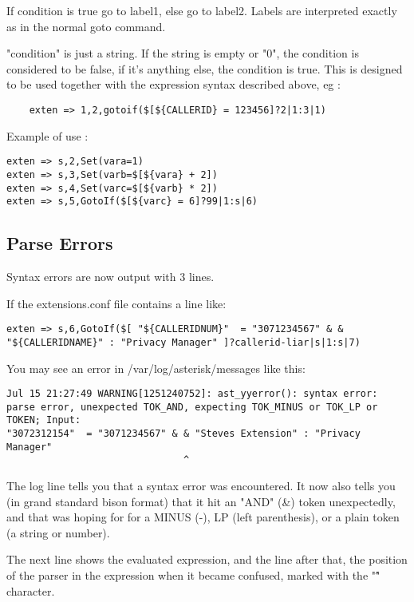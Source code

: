 If condition is true go to label1, else go to label2. Labels are interpreted
exactly as in the normal goto command.

"condition" is just a string. If the string is empty or "0", the condition
is considered to be false, if it's anything else, the condition is true. 
This is designed to be used together with the expression syntax described 
above, eg : 

\begin{verbatim}
	exten => 1,2,gotoif($[${CALLERID} = 123456]?2|1:3|1)
\end{verbatim}

Example of use : 

\begin{verbatim}
exten => s,2,Set(vara=1)
exten => s,3,Set(varb=$[${vara} + 2])
exten => s,4,Set(varc=$[${varb} * 2])
exten => s,5,GotoIf($[${varc} = 6]?99|1:s|6)
\end{verbatim}

\subsection{Parse Errors}

Syntax errors are now output with 3 lines.

If the extensions.conf file contains a line like:

\begin{verbatim}
exten => s,6,GotoIf($[ "${CALLERIDNUM}"  = "3071234567" & &  "${CALLERIDNAME}" : "Privacy Manager" ]?callerid-liar|s|1:s|7)
\end{verbatim}

You may see an error in /var/log/asterisk/messages like this:
\begin{verbatim}
Jul 15 21:27:49 WARNING[1251240752]: ast_yyerror(): syntax error: parse error, unexpected TOK_AND, expecting TOK_MINUS or TOK_LP or TOKEN; Input:
"3072312154"  = "3071234567" & & "Steves Extension" : "Privacy Manager" 
                               ^
\end{verbatim}

The log line tells you that a syntax error was encountered. It now
also tells you (in grand standard bison format) that it hit an "AND"
(\&) token unexpectedly, and that was hoping for for a MINUS (-), LP
(left parenthesis), or a plain token (a string or number).

The next line shows the evaluated expression, and the line after
that, the position of the parser in the expression when it became confused,
marked with the "\^" character.

